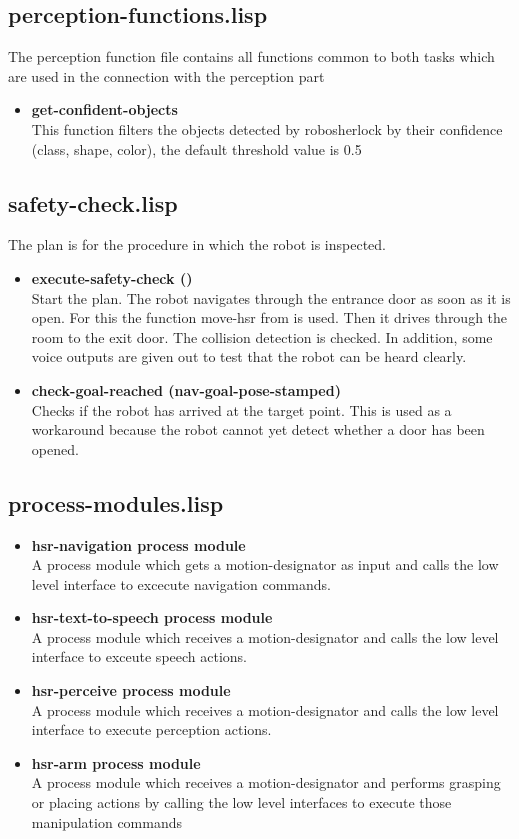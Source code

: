 \documentclass[main.tex]{subfiles}
\begin{document}
	    \subsection{perception-functions.lisp}
	    The perception function file contains all functions common to both tasks which are used in the connection with the perception part
	    \begin{itemize}
	    	\item \textbf{get-confident-objects} \\
	    	This function filters the objects detected by robosherlock by their confidence (class, shape, color), the default threshold value is 0.5
	    \end{itemize}
	    \subsection{safety-check.lisp}
	    The plan is for the procedure in which the robot is inspected. 
	    \begin{itemize}
	    	\item \textbf{execute-safety-check ()} \\
	    	Start the plan. The robot navigates through the entrance door as soon as it is open. For this the function move-hsr from  is used. Then it drives through the room to the exit door. The collision detection is checked. In addition, some voice outputs are given out to test that the robot can be heard clearly.
	    	\item \textbf{check-goal-reached (nav-goal-pose-stamped)}\\
	    	Checks if the robot has arrived at the target point. This is used as a workaround because the robot cannot yet detect whether a door has been opened.
	    \end{itemize}
	    \subsection{process-modules.lisp}
	     \begin{itemize}
	    	\item \textbf{hsr-navigation process module} \\
		A process module which gets a motion-designator as input and calls the low level interface to excecute navigation commands.
		\item \textbf{hsr-text-to-speech process module} \\
		A process module which receives a motion-designator and calls the low level interface to exceute speech actions.
		\item \textbf{hsr-perceive process module} \\
		A process module which receives a motion-designator and calls the low level interface to execute perception actions.
		\item\textbf{hsr-arm process module} \\
		A process module which receives a motion-designator and performs grasping or placing actions by calling the low level interfaces to execute those manipulation commands 
	    \end{itemize}
\end{document}
